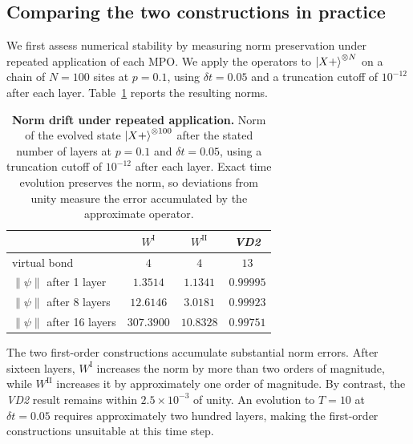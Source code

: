 
\subsection{Comparing the two constructions in practice}
\label{app:mpo:comparison}

We first assess numerical stability by measuring norm preservation under repeated application of each \ac{MPO}. We apply the operators to $\ket{X+}^{\otimes N}$ on a chain of $N=100$ sites at $p=0.1$, using $\delta t=0.05$ and a truncation cutoff of $10^{-12}$ after each layer. Table~\ref{tab:mpo_norm} reports the resulting norms.

\begin{table}[!htbp]
  \centering
  \begin{tabular}{lccc}
    \hline
                                       & $W^{\mathrm{I}}$ & $W^{\mathrm{II}}$ & \textit{VD2} \\
    \hline
    virtual bond                       & $4$              & $4$               & $13$         \\
    $\lVert\psi\rVert$ after 1 layer   & $1.3514$         & $1.1341$          & $0.99995$    \\
    $\lVert\psi\rVert$ after 8 layers  & $12.6146$        & $3.0181$          & $0.99923$    \\
    $\lVert\psi\rVert$ after 16 layers & $307.3900$       & $10.8328$         & $0.99751$    \\
    \hline
  \end{tabular}
  \caption{\textbf{Norm drift under repeated application.} Norm of the evolved state $\ket{X+}^{\otimes 100}$ after the stated number of layers at $p=0.1$ and $\delta t=0.05$, using a truncation cutoff of $10^{-12}$ after each layer. Exact time evolution preserves the norm, so deviations from unity measure the error accumulated by the approximate operator.}
  \label{tab:mpo_norm}
\end{table}

The two first-order constructions accumulate substantial norm errors. After sixteen layers, $W^{\mathrm{I}}$ increases the norm by more than two orders of magnitude, while $W^{\mathrm{II}}$ increases it by approximately one order of magnitude. By contrast, the \textit{VD2} result remains within $2.5\times10^{-3}$ of unity. An evolution to $T=10$ at $\delta t=0.05$ requires approximately two hundred layers, making the first-order constructions unsuitable at this time step.

